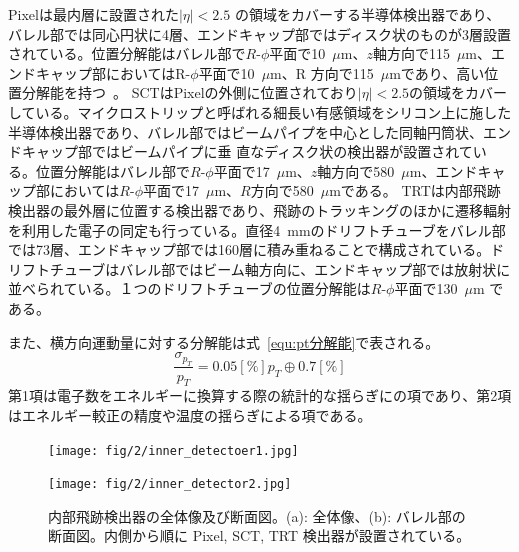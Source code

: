 Pixelは最内層に設置された$|\eta| < 2.5$ の領域をカバーする半導体検出器であり、バレル部では同心円状に4層、エンドキャップ部ではディスク状のものが3層設置されている。位置分解能はバレル部で$R$-$\phi$平面で10~$\mu$m、$z$軸方向で115~$\mu$m、エンドキャップ部においてはR-$\phi$平面で10~$\mu$m、R 方向で115~$\mu$mであり、高い位置分解能を持つ~\cite{Aad:1129811}。
SCTはPixelの外側に位置されており$|\eta| < 2.5$の領域をカバーしている。マイクロストリップと呼ばれる細長い有感領域をシリコン上に施した半導体検出器であり、バレル部ではビームパイプを中心とした同軸円筒状、エンドキャップ部ではビームパイプに垂
直なディスク状の検出器が設置されている。位置分解能はバレル部で$R$-$\phi$平面で17~$\mu$m、$z$軸方向で580~$\mu$m、エンドキャップ部においては$R$-$\phi$平面で17~$\mu$m、$R$方向で580~$\mu$mである\cite{Aad:1129811}。
TRTは内部飛跡検出器の最外層に位置する検出器であり、飛跡のトラッキングのほかに遷移輻射を利用した電子の同定も行っている。直径4~mmのドリフトチューブをバレル部では73層、エンドキャップ部では160層に積み重ねることで構成されている。ドリフトチューブはバレル部ではビーム軸方向に、エンドキャップ部では放射状に並べられている。１つのドリフトチューブの位置分解能は$R$-$\phi$平面で130~$\mu$m である。

また、横方向運動量に対する分解能は式~\ref{equ:pt分解能}で表される。
\begin{equation}
    \frac{\sigma_{p_{T}}}{p_{T}} = 0.05[\%]p_{T}\oplus 0.7 [\%]
　\label{equ:pt分解能}
\end{equation}
第1項は電子数をエネルギーに換算する際の統計的な揺らぎにの項であり、第2項はエネルギー較正の精度や温度の揺らぎによる項である。

\begin{figure}
    \centering
    \begin{minipage}[b]{0.4\linewidth}
        \centering
        \hspace*{-1cm}
        \texttt{[image: fig/2/inner\_detectoer1.jpg]}
        \vspace{10pt}
        \subcaption{}
        \label{fig:内部飛跡検出器の概略図1}
    \end{minipage}
    \hfill
    \begin{minipage}[b]{0.5\linewidth}
        \centering
        \texttt{[image: fig/2/inner\_detector2.jpg]}
        \vspace{10pt}
        \subcaption{}
        \label{fig:内部飛跡検出器の概略図2}
    \end{minipage}
    \caption{内部飛跡検出器の全体像及び断面図。(a): 全体像\cite{Aad:1129811}、(b): バレル部の断面図\cite{Collaboration:2723878}。内側から順に Pixel, SCT, TRT 検出器が設置されている。}
    \label{fig:内部飛跡検出器}
\end{figure}



